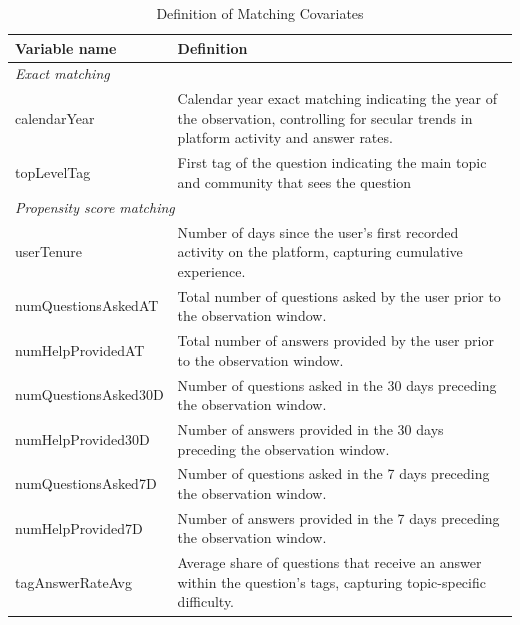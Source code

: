 \begin{table}
\caption{Definition of Matching Covariates}
\label{tab:covariates}
\centering\small
\begin{tabular}{p{4cm} p{9cm}}
\toprule
\textbf{Variable name} & \textbf{Definition} \\
\midrule
\textit{Exact matching} & \\
calendarYear & Calendar year exact matching indicating the year of the observation, controlling for secular trends in platform activity and answer rates. \\
topLevelTag & First tag of the question indicating the main topic and community that sees the question \\

\multicolumn{2}{l}{\textit{Propensity score matching}}\\
userTenure & Number of days since the user's first recorded activity on the platform, capturing cumulative experience. \\
numQuestionsAskedAT & Total number of questions asked by the user prior to the observation window. \\

numHelpProvidedAT & Total number of answers provided by the user prior to the observation window. \\

numQuestionsAsked30D & Number of questions asked in the 30 days preceding the observation window. \\

numHelpProvided30D & Number of answers provided in the 30 days preceding the observation window. \\

numQuestionsAsked7D & Number of questions asked in the 7 days preceding the observation window. \\

numHelpProvided7D & Number of answers provided in the 7 days preceding the observation window. \\

tagAnswerRateAvg & Average share of questions that receive an answer within the question's tags, capturing topic-specific difficulty.
\bottomrule
\end{tabular}
\end{table}

